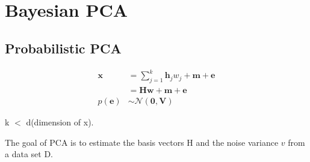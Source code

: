 \documentclass{article}
\begin{document}
\section{Bayesian PCA\cite{minka__AutomaticChoiceDimensionality}}

\subsection{Probabilistic PCA}
\begin{equation}
    \begin{aligned}
    \mathbf{x} &=\sum_{j=1}^{k} \mathbf{h}_{j} w_{j}+\mathbf{m}+\mathbf{e} \\
    &=\mathbf{H} \mathbf{w}+\mathbf{m}+\mathbf{e} \\
    p(\mathbf{e}) & \sim \mathcal{N}(\mathbf{0}, \mathbf{V})
    \end{aligned}
\end{equation}

k $<$ d(dimension of x).

The goal of PCA is to estimate the basis vectors H and the noise variance $v$ from a data set D.



\appendix
\end{document}

